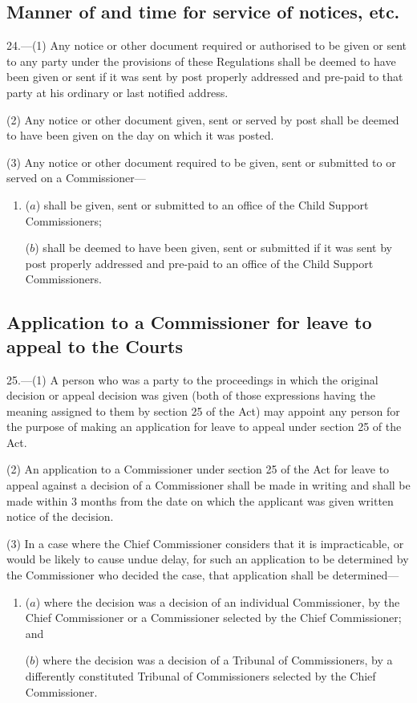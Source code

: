 \documentclass[12pt,a4paper]{article}
\begin{document}
\subsection[24. Manner of and time for service of notices, etc.]{Manner of and time for service of notices, etc.}

24.—(1) Any notice or other document required or authorised to be given or sent to any party under the provisions of these Regulations shall be deemed to have been given or sent if it was sent by post properly addressed and pre-paid to that party at his ordinary or last notified address.

(2) Any notice or other document given, sent or served by post shall be deemed to have been given on the day on which it was posted.

(3) Any notice or other document required to be given, sent or submitted to or served on a Commissioner—
\begin{enumerate}\item[]
($a$) shall be given, sent or submitted to an office of the Child Support Commissioners;

($b$) shall be deemed to have been given, sent or submitted if it was sent by post properly addressed and pre-paid to an office of the Child Support Commissioners.
\end{enumerate}

\subsection[25. Application to a Commissioner for leave to appeal to the Courts]{Application to a Commissioner for leave to appeal to the Courts}

25.—(1) A person who was a party to the proceedings in which the original decision or appeal decision was given (both of those expressions having the meaning assigned to them by section 25 of the Act) may appoint any person for the purpose of making an application for leave to appeal under section 25 of the Act.

(2) An application to a Commissioner under section 25 of the Act for leave to appeal against a decision of a Commissioner shall be made in writing and shall be made within 3 months from the date on which the applicant was given written notice of the decision.

(3) In a case where the Chief Commissioner considers that it is impracticable, or would be likely to cause undue delay, for such an application to be determined by the Commissioner who decided the case, that application shall be determined—
\begin{enumerate}\item[]
($a$) where the decision was a decision of an individual Commissioner, by the Chief Commissioner or a Commissioner selected by the Chief Commissioner; and

($b$) where the decision was a decision of a Tribunal of Commissioners, by a differently constituted Tribunal of Commissioners selected by the Chief Commissioner.
\end{enumerate}
\end{document}
